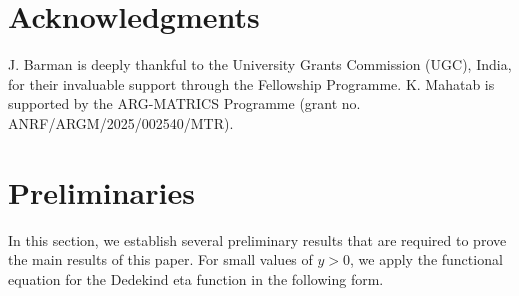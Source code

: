\documentclass[11pt]{amsart}
\theoremstyle{plain}
\newtheorem{lemma}[theorem]{Lemma}
\numberwithin{equation}{section}
\begin{document}
	
	\section{Acknowledgments}
	J. Barman is deeply thankful to the University Grants Commission (UGC), India, for their invaluable support through the Fellowship Programme. K. Mahatab is supported by the ARG-MATRICS Programme (grant no. ANRF/ARGM/2025/002540/MTR).
	\section{Preliminaries}
	In this section, we establish several preliminary results that are required to prove the main results of this paper. 	
	For small values of $y > 0$, we apply the functional equation for the Dedekind eta function in the following form.
	
\end{document}

